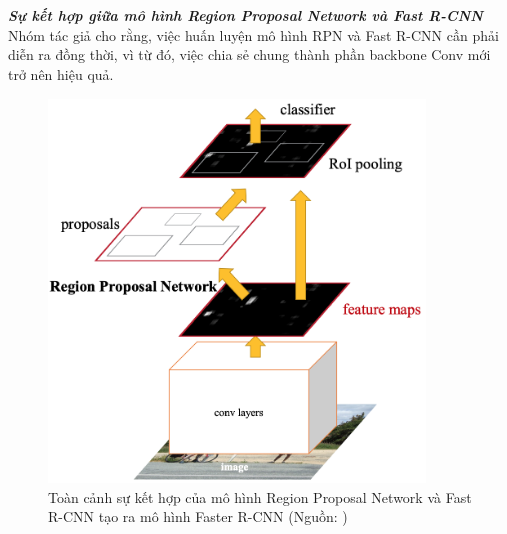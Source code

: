 {    \noindent
    \textbf{\textit{Sự kết hợp giữa mô hình Region Proposal Network và Fast R-CNN}} \\
    Nhóm tác giả cho rằng, việc huấn luyện mô hình RPN và Fast R-CNN cần phải diễn ra đồng thời, vì từ đó, việc chia sẻ chung thành phần backbone Conv mới trở nên hiệu quả.

    \begin{figure}[H]
        \centering
        \includegraphics[width=10cm] {images/faster_rcnn_model}
        \caption{Toàn cảnh sự kết hợp của mô hình Region Proposal Network và Fast R-CNN tạo ra mô hình Faster R-CNN (Nguồn: \cite{ren2015faster})}
        \label{fig:faster_model}
    \end{figure}

}
